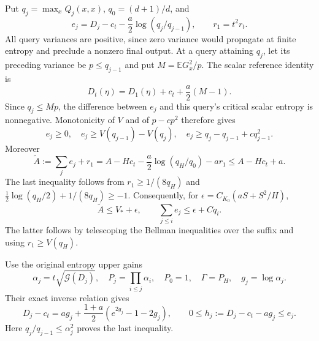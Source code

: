 \documentclass[11pt]{article}
\theoremstyle{remark}
\newcommand{\E}{\mathbb E}
\newcommand{\Gain}{\mathcal G}
\begin{document}
Put $q_j=\max_xQ_j(x,x)$, $q_0=(d+1)/d$, and
\[
 e_j=D_j-c_t-\frac a2\log(q_j/q_{j-1}),\qquad
 r_1=t^2r_t.
\]
All query variances are positive, since zero variance would
propagate at finite entropy and preclude a nonzero final output.
At a query attaining $q_j$, let its preceding variance be
$p\le q_{j-1}$ and put $M=\E G_x^2/p$. The scalar reference
identity is
\[
 D_t(\eta)=D_1(\eta)+c_t+\frac a2(M-1).
\]
Since $q_j\le Mp$, the difference between $e_j$ and this
query's critical scalar entropy is nonnegative. Monotonicity of
$V$ and of $p-cp^2$ therefore gives
\begin{equation}
 e_j\ge0,\quad
 e_j\ge V(q_{j-1})-V(q_j),\quad
 e_j\ge q_j-q_{j-1}+cq_{j-1}^2.
 \label{eq:uniform-adjusted}
\end{equation}
Moreover
\[
 \widetilde A:=\sum_j e_j+r_1
 =A-Hc_t-\frac a2\log(q_H/q_0)-ar_1
 \le A-Hc_t+a.
\]
The last inequality follows from
$r_1\ge1/(8q_H)$ and
$\tfrac12\log(q_H/2)+1/(8q_H)\ge-1$.
Consequently, for $\epsilon=C_{K_0}(aS+S^2/H)$,
\begin{equation}
 \widetilde A\le V_*+\epsilon,\qquad
 \sum_{j\le i}e_j\le\epsilon+Cq_i.
 \label{eq:uniform-prefix-budget}
\end{equation}
The latter follows by telescoping the Bellman inequalities over
the suffix and using $r_1\ge V(q_H)$.

Use the original entropy upper gains
\[
 \alpha_j=t\sqrt{\Gain(D_j)},\quad
 P_j=\prod_{i\le j}\alpha_i,\quad P_0=1,\quad
 \Gamma=P_H,\quad g_j=\log\alpha_j.
\]
Their exact inverse relation gives
\begin{equation}
 D_j-c_t=ag_j+
       \frac{1+a}{2}(e^{2g_j}-1-2g_j),\qquad
 0\le h_j:=D_j-c_t-ag_j\le e_j.
 \label{eq:uniform-gain-remainder}
\end{equation}
Here $q_j/q_{j-1}\le\alpha_j^2$ proves the last inequality.
\end{document}
